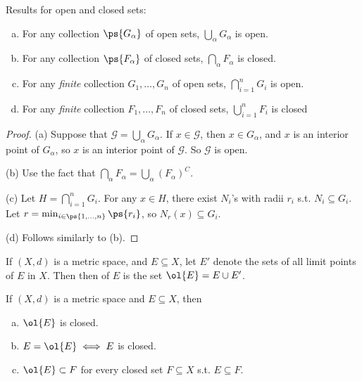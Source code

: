 \documentclass[11pt]{scrartcl}
\numberwithin{equation}{section}
\begin{document}
\begin{theorem}
    Results for open and closed sets:
    \begin{enumerate}[a.]
        \item For any collection $\ps{G_\alpha}$ of open sets,
        $\bigcup_\alpha G_\alpha$ is open.
        \item For any collection $\ps{F_\alpha}$ of closed sets,
        $\bigcap_\alpha F_\alpha$ is closed.
        \item For any \textit{finite} collection 
        $G_1,\dots, G_n$ of open sets,
        $\bigcap_{i=1}^n G_i$ is open.
        \item For any \textit{finite} collection 
        $F_1,\dots, F_n$ of closed sets,
        $\bigcup_{i=1}^n F_i$ is closed
    \end{enumerate}
\end{theorem}
\begin{proof}
    (a) Suppose that $\mathcal G = \bigcup_\alpha G_\alpha$. If $x\in \mathcal G$, then $x \in G_\alpha$, and $x$ is an interior point of 
    $G_\alpha$, so $x$ is an interior point of $\mathcal G$. So 
    $\mathcal{G}$ is open.

    (b) Use the fact that $\bigcap_\alpha F_\alpha = \bigcup_\alpha(F_\alpha)^C$.

    (c) Let $H = \bigcap_{i=1}^n G_i$. For any $x\in H$, there exist $N_i$'s with 
    radii $r_i$ s.t. $N_i\subseteq G_i$. Let $r=\min_{i\in\ps{1,\dots,n}}\ps{r_i}$, so $N_r(x)\subseteq G_i$.
    
    (d) Follows similarly to (b).
\end{proof}

\begin{definition}
    If $(X,d)$ is a metric space, and $E\subseteq X$, let $E'$ denote 
    the sets of all limit points of $E$ in $X$. Then then 
    of $E$ is the set $\ol{E} = E \cup E'$.
\end{definition}

\begin{theorem}
    If $(X,d)$ is a metric space and $E\subseteq X$, then 
    \begin{enumerate}[a.]
        \item $\ol{E}$ is closed.
        \item $E=\ol{E} \iff E$ is closed.
        \item $\ol{E}\subset F$ for every closed set $F\subseteq X$ s.t.   
        $E\subseteq F$.
    \end{enumerate}
\end{theorem}
\end{document}
